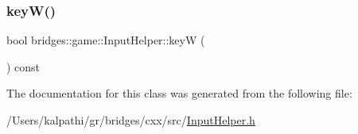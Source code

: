 \mbox{\label{classbridges_1_1game_1_1_input_helper_a97a204c00019b28b4e95dde0b757a1aa}} 
\subsubsection{\texorpdfstring{keyW()}{keyW()}}
{\footnotesize\ttfamily bool bridges\+::game\+::\+Input\+Helper\+::keyW (\begin{DoxyParamCaption}{ }\end{DoxyParamCaption}) const\hspace{0.3cm}{\ttfamily [inline]}}



The documentation for this class was generated from the following file\+:\begin{DoxyCompactItemize}
\item 
/\+Users/kalpathi/gr/bridges/cxx/src/\mbox{\hyperlink{_input_helper_8h}{Input\+Helper.\+h}}\end{DoxyCompactItemize}
